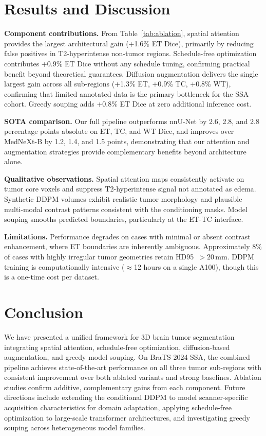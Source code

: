 \documentclass[conference]{IEEEtran}
\begin{document}
\section{Results and Discussion}

\textbf{Component contributions.} From Table~\ref{tab:ablation},
spatial attention provides the largest architectural gain (+1.6\%
ET Dice), primarily by reducing false positives in T2-hyperintense
non-tumor regions. Schedule-free optimization contributes +0.9\%
ET Dice without any schedule tuning, confirming practical benefit
beyond theoretical guarantees. Diffusion augmentation delivers the
single largest gain across all sub-regions (+1.3\% ET, +0.9\% TC,
+0.8\% WT), confirming that limited annotated data is the primary
bottleneck for the SSA cohort. Greedy souping adds +0.8\% ET Dice
at zero additional inference cost.

\textbf{SOTA comparison.} Our full pipeline outperforms nnU-Net
by 2.6, 2.8, and 2.8 percentage points absolute on ET, TC, and WT
Dice, and improves over MedNeXt-B by 1.2, 1.4, and 1.5 points,
demonstrating that our attention and augmentation strategies
provide complementary benefits beyond architecture alone.

\textbf{Qualitative observations.} Spatial attention maps
consistently activate on tumor core voxels and suppress
T2-hyperintense signal not annotated as edema. Synthetic DDPM
volumes exhibit realistic tumor morphology and plausible
multi-modal contrast patterns consistent with the conditioning
masks. Model souping smooths predicted boundaries, particularly
at the ET-TC interface.

\textbf{Limitations.} Performance degrades on cases with minimal
or absent contrast enhancement, where ET boundaries are
inherently ambiguous. Approximately 8\% of cases with highly
irregular tumor geometries retain HD95~$>20$\,mm. DDPM training
is computationally intensive ($\approx$12 hours on a single
A100), though this is a one-time cost per dataset.

\section{Conclusion}

We have presented a unified framework for 3D brain tumor
segmentation integrating spatial attention, schedule-free
optimization, diffusion-based augmentation, and greedy model
souping. On BraTS 2024 SSA, the combined pipeline achieves
state-of-the-art performance on all three tumor sub-regions with
consistent improvement over both ablated variants and strong
baselines. Ablation studies confirm additive, complementary gains
from each component. Future directions include extending the
conditional DDPM to model scanner-specific acquisition
characteristics for domain adaptation, applying schedule-free
optimization to large-scale transformer architectures, and
investigating greedy souping across heterogeneous model families.
\end{document}
